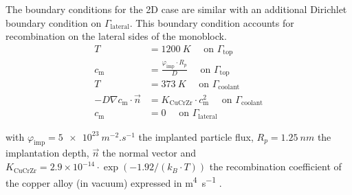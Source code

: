 The boundary conditions for the 2D case are similar with an additional Dirichlet boundary condition on $\Gamma_\mathrm{lateral}$.
This boundary condition accounts for recombination on the lateral sides of the monoblock.
\begin{subequations}
    \begin{align}
        T &=  \SI{1200}{K}\quad \text { on } \Gamma_\mathrm{top}\\
        c_\mathrm{m} &=  \frac{\varphi_\mathrm{imp} \cdot R_p}{D}\quad \text { on } \Gamma_\mathrm{top}\\
        T &= \SI{373}{K}\quad \text { on } \Gamma_\mathrm{coolant}\\
        -D \nabla c_\mathrm{m} \cdot \vec{n} &= K_\mathrm{CuCrZr} \cdot c_\mathrm{m}^{2} \quad \text { on } \Gamma_\mathrm{coolant} \\
        c_\mathrm{m} &= 0 \quad \text { on } \Gamma_\mathrm{lateral}
    \end{align}
\end{subequations}

with $\varphi_\mathrm{imp} = \SI{5e23}{m^{-2}.s^{-1}}$ the implanted particle flux, $R_p = \SI{1.25}{nm}$ the implantation depth, $\vec{n}$ the normal vector and $K_\mathrm{CuCrZr} = 2.9 \times 10^{-14}\cdot \exp{(-1.92/(k_B\cdot T))}$ the recombination coefficient of the copper alloy (in vacuum) expressed in \si{m^4.s^{-1}} .


